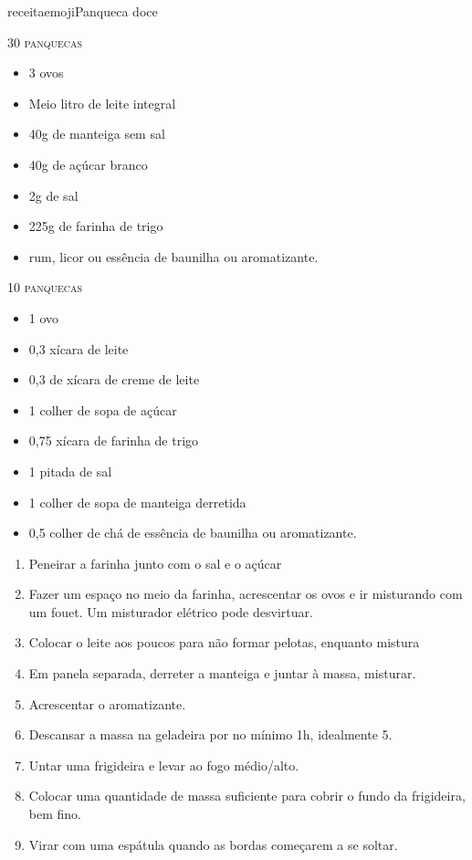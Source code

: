 receitaemoji{Panqueca doce}{

	\textsc{30 panquecas}

	\begin{itemize}
		\item 3 ovos
		\item Meio litro de leite integral
		\item 40g de manteiga sem sal
		\item 40g de açúcar branco
		\item 2g de sal
		\item 225g de farinha de trigo
		\item rum, licor ou essência de baunilha ou aromatizante.
	\end{itemize}

	\textsc{10 panquecas}
	\begin{itemize}
		\item 1 ovo
		\item 0,3 xícara de leite
		\item 0,3 de xícara de creme de leite
		\item 1 colher de sopa de açúcar
		\item 0,75 xícara de farinha de trigo
		\item 1 pitada de sal
		\item 1 colher de sopa de manteiga derretida
		\item 0,5 colher de chá de essência de baunilha ou aromatizante.
	\end{itemize}
}{
	\begin{enumerate}
		\item Peneirar a farinha junto com o sal e o açúcar
		\item Fazer um espaço no meio da farinha, acrescentar os ovos e ir misturando
		      com um fouet. Um misturador elétrico pode desvirtuar.
		\item Colocar o leite aos poucos para não formar pelotas, enquanto mistura
		\item Em panela separada, derreter a manteiga e juntar à massa, misturar.
		\item Acrescentar o aromatizante.
		\item Descansar a massa na geladeira por no mínimo 1h, idealmente 5.
		\item Untar uma frigideira e levar ao fogo médio/alto.
		\item Colocar uma quantidade de massa suficiente para cobrir o fundo da
		      frigideira, bem fino.
		\item Virar com uma espátula quando as bordas começarem a se soltar.
	\end{enumerate}
}

